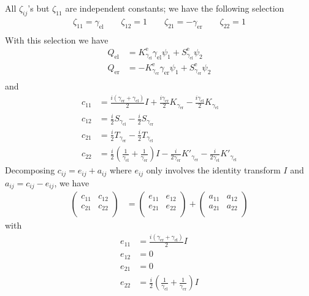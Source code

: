 All $\zeta_{ij}$'s but $\zeta_{11}$ are independent constants; we have the following selection 
\begin{gather*}
  \zeta_{11} = \gamma_\text{el} \qquad \zeta_{12} =1 \qquad \zeta_{21} = -\gamma_\text{er} \qquad \zeta_{22} = 1\\
\end{gather*}
With this selection we have
\begin{align*}
  Q_\text{el} &= K_{\gamma_\text{el}}^{\text{e}} \gamma_\text{el}\psi_1 + S_{\gamma_\text{el}}^{\text{e}} \psi_2\\
  Q_\text{er} &= -K_{\gamma_\text{er}}^{\text{e}} \gamma_\text{er}\psi_1 + S_{\gamma_\text{er}}^{\text{e}} \psi_2\\
\end{align*}
and
\begin{align*}
  c_{11} &= \frac{i\left(\gamma_\text{er}+\gamma_\text{el}\right)}{2}I + \frac{i\gamma_\text{er}}{2}K_{\gamma_\text{er}}-\frac{i\gamma_\text{el}}{2}K_{\gamma_\text{el}}\\
  c_{12} &= \frac{i}{2}S_{\gamma_\text{el}}-\frac{i}{2}S_{\gamma_\text{er}}\\
  c_{21} &= \frac{i}{2}T_{\gamma_\text{er}}-\frac{i}{2}T_{\gamma_\text{el}}\\
  c_{22} &= \frac{i}{2}\left(\frac{1}{\gamma_\text{el}} + \frac{1}{\gamma_\text{er}}\right)I - \frac{i}{2\gamma_\text{er}}K'_{\gamma_\text{er}} - \frac{i}{2 \gamma_\text{el}} K'_{\gamma_\text{el}}
\end{align*}
Decomposing $c_{ij} = e_{ij} + a_{ij}$ where $e_{ij}$ only involves the identity transform $I$ and $a_{ij}=c_{ij}-e_{ij}$, we have
\begin{align*}
  \begin{pmatrix}
    c_{11} & c_{12} \\
    c_{21} & c_{22} \\
  \end{pmatrix} &=
  \begin{pmatrix}
    e_{11} & e_{12} \\
    e_{21} & e_{22} \\
  \end{pmatrix} + 
  \begin{pmatrix}
    a_{11} & a_{12} \\
    a_{21} & a_{22} \\
  \end{pmatrix} 
\end{align*}
with
\begin{align*}
  e_{11} &= \frac{i\left(\gamma_\text{er}+\gamma_\text{el}\right)}{2}I \\
  e_{12} &= 0\\
  e_{21} &= 0\\
  e_{22} &= \frac{i}{2}\left(\frac{1}{\gamma_\text{el}} + \frac{1}{\gamma_\text{er}}\right)I \\
\end{align*}
